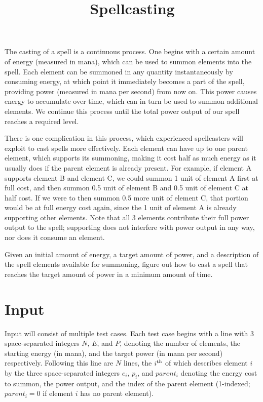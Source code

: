 \documentclass{article}
\title{Spellcasting}
\date{}
\begin{document}
\maketitle

The casting of a spell is a continuous process.  One begins with a certain
amount of energy (measured in mana), which can be used to summon elements into
the spell.  Each element can be summoned in any quantity instantaneously by
consuming energy, at which point it immediately becomes a part of the spell,
providing power (measured in mana per second) from now on.  This power causes
energy to accumulate over time, which can in turn be used to summon additional
elements.  We continue this process until the total power output of our spell
reaches a required level.

There is one complication in this process, which experienced spellcasters will
exploit to cast spells more effectively.  Each element can have up to one
parent element, which supports its summoning, making it cost half as much
energy as it usually does if the parent element is already present.  For
example, if element A supports element B and element C, we could summon 1 unit
of element A first at full cost, and then summon 0.5 unit of element B and 0.5
unit of element C at half cost.  If we were to then summon 0.5 more unit of
element C, that portion would be at full energy cost again, since the 1 unit of
element A is already supporting other elements.  Note that all 3 elements
contribute their full power output to the spell; supporting does not interfere
with power output in any way, nor does it consume an element.

Given an initial amount of energy, a target amount of power, and a description
of the spell elements available for summoning, figure out how to cast a spell
that reaches the target amount of power in a minimum amount of time.

\section{Input}

Input will consist of multiple test cases.  Each test case begins with a line
with 3 space-separated integers $N$, $E$, and $P$, denoting the number of
elements, the starting energy (in mana), and the target power (in mana per
second) respectively.  Following this line are $N$ lines, the
$i^{\mbox{\scriptsize{th}}}$ of which describes element $i$ by the three
space-separated integers $e_i$, $p_i$, and $parent_i$ denoting the energy cost
to summon, the power output, and the index of the parent element (1-indexed;
$parent_i = 0$ if element $i$ has no parent element).
\end{document}
